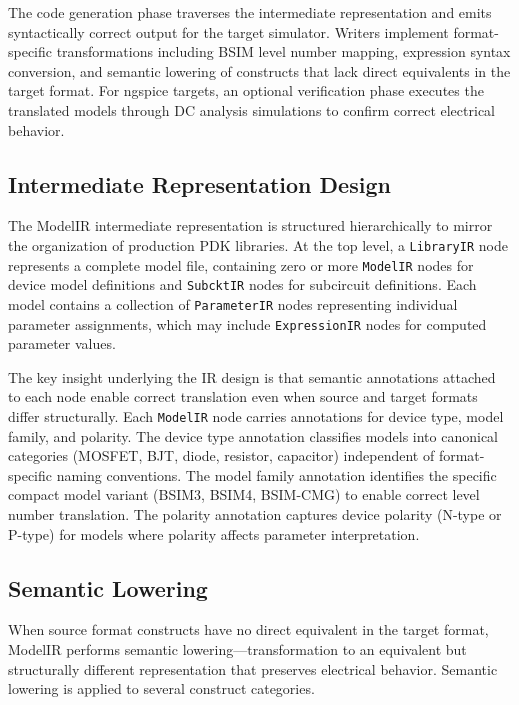 \documentclass[conference]{IEEEtran}
\begin{document}
The code generation phase traverses the intermediate representation and emits syntactically correct output for the target simulator. Writers implement format-specific transformations including BSIM level number mapping, expression syntax conversion, and semantic lowering of constructs that lack direct equivalents in the target format. For ngspice targets, an optional verification phase executes the translated models through DC analysis simulations to confirm correct electrical behavior.

\subsection{Intermediate Representation Design}

The ModelIR intermediate representation is structured hierarchically to mirror the organization of production PDK libraries. At the top level, a \texttt{LibraryIR} node represents a complete model file, containing zero or more \texttt{ModelIR} nodes for device model definitions and \texttt{SubcktIR} nodes for subcircuit definitions. Each model contains a collection of \texttt{ParameterIR} nodes representing individual parameter assignments, which may include \texttt{ExpressionIR} nodes for computed parameter values.

The key insight underlying the IR design is that semantic annotations attached to each node enable correct translation even when source and target formats differ structurally. Each \texttt{ModelIR} node carries annotations for device type, model family, and polarity. The device type annotation classifies models into canonical categories (MOSFET, BJT, diode, resistor, capacitor) independent of format-specific naming conventions. The model family annotation identifies the specific compact model variant (BSIM3, BSIM4, BSIM-CMG) to enable correct level number translation. The polarity annotation captures device polarity (N-type or P-type) for models where polarity affects parameter interpretation.

\subsection{Semantic Lowering}

When source format constructs have no direct equivalent in the target format, ModelIR performs semantic lowering---transformation to an equivalent but structurally different representation that preserves electrical behavior. Semantic lowering is applied to several construct categories.
\end{document}
